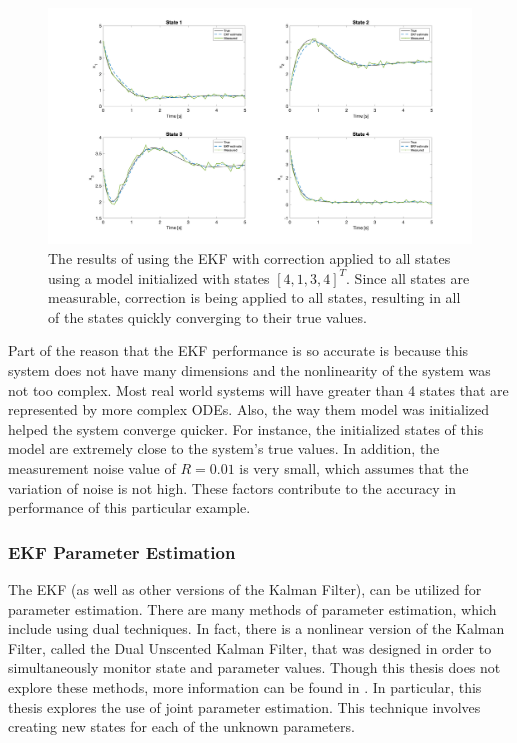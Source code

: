 
\begin{figure}[ht]
    \centering
    \includegraphics[scale = 0.3]{EKF_4state.png}
    \caption{The results of using the EKF with correction applied to all states using a model initialized with states $[4, 1, 3, 4]^T$. Since all states are measurable, correction is being applied to all states, resulting in all of the states quickly converging to their true values.}
    \label{fig:EKF_4state}
  \end{figure}

\noindent Part of the reason that the EKF performance is so accurate is because this system does not have many dimensions and the nonlinearity of the system was not too complex. Most real world systems will have greater than 4 states that are represented by more complex ODEs. Also, the way them model was initialized helped the system converge quicker. For instance, the initialized states of this model are extremely close to the system's true values. In addition, the measurement noise value of $R=0.01$ is very small, which assumes that the variation of noise is not high. These factors contribute to the accuracy in performance of this particular example. 



\clearpage
\subsubsection{EKF Parameter Estimation}
The EKF (as well as other versions of the Kalman Filter), can be utilized for parameter estimation. There are many methods of parameter estimation, which include using dual techniques. In fact, there is a nonlinear version of the Kalman Filter, called the Dual Unscented Kalman Filter, that was designed in order to simultaneously monitor state and parameter values. Though this thesis does not explore these methods, more information can be found in \cite{inbook, article6}. In particular, this thesis explores the use of joint parameter estimation. This technique involves creating new states for each of the unknown parameters. \\ 

